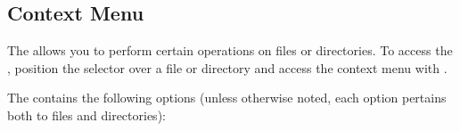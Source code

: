\subsection{\label{ref:Contextmenu}\label{ref:PartIISectionFM}Context Menu}

The  allows you to perform certain operations on files or 
directories.  To access the , position the selector over a file 
or directory and access the context menu with \ActionStdContext{}.\\


The  contains the following options (unless otherwise noted, 
each option pertains both to files and directories):

